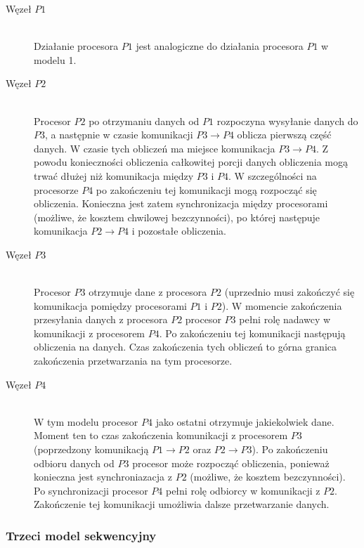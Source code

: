 \begin{description}

\item[Węzeł $P1$] \hfill \\

Działanie procesora $P1$ jest analogiczne do działania procesora $P1$ w modelu 1.

\item[Węzeł $P2$] \hfill \\

Procesor $P2$ po otrzymaniu danych od $P1$ rozpoczyna wysyłanie danych do $P3$, a następnie w czasie komunikacji $P3 \to P4$ oblicza pierwszą część danych.
W czasie tych obliczeń ma miejsce komunikacja $P3 \to P4$. Z powodu konieczności obliczenia całkowitej porcji danych obliczenia mogą trwać dłużej niż komunikacja
między $P3$ i $P4$. W szczególności na procesorze $P4$ po zakończeniu tej komunikacji mogą rozpocząć się obliczenia.
Konieczna jest zatem synchronizacja między procesorami (możliwe, że kosztem chwilowej bezczynności), po której następuje komunikacja $P2 \to P4$ i pozostałe obliczenia.

\item[Węzeł $P3$] \hfill \\

Procesor $P3$ otrzymuje dane z procesora $P2$ (uprzednio musi zakończyć się komunikacja pomiędzy procesorami $P1$ i $P2$). W momencie zakończenia przesyłania danych z procesora $P2$ procesor $P3$ pełni rolę nadawcy w komunikacji z procesorem $P4$. Po zakończeniu tej komunikacji następują obliczenia na danych. Czas zakończenia tych obliczeń to górna granica zakończenia przetwarzania na tym procesorze.

\item[Węzeł $P4$] \hfill \\

W tym modelu procesor $P4$ jako ostatni otrzymuje jakiekolwiek dane. Moment ten to czas zakończenia komunikacji z procesorem $P3$ (poprzedzony komunikacją $P1 \to P2$ oraz $P2 \to P3$). Po zakończeniu odbioru danych od $P3$ procesor może rozpocząć obliczenia, ponieważ konieczna jest synchroniazacja z $P2$ (możliwe, że kosztem bezczynności). Po synchronizacji procesor $P4$ pełni rolę odbiorcy w komunikacji z $P2$. Zakończenie tej komunikacji umożliwia dalsze przetwarzanie danych. 

\end{description}

\subsubsection{Trzeci model sekwencyjny}


